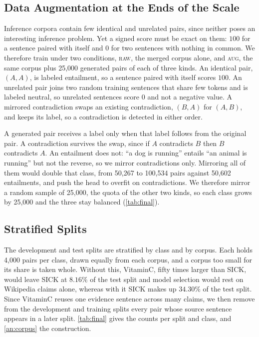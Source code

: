 \documentclass[11pt]{article}
\begin{document}
\subsection{Data Augmentation at the Ends of the Scale}

Inference corpora contain few identical and unrelated pairs, since neither poses an interesting inference problem.
Yet a signed score must be exact on them: $100$ for a sentence paired with itself and $0$ for two sentences with nothing in common.
We therefore train under two conditions, \textsc{raw}, the merged corpus alone, and \textsc{aug}, the same corpus plus 25{,}000 generated pairs of each of three kinds.
An identical pair, $(A, A)$, is labeled entailment, so a sentence paired with itself scores $100$.
An unrelated pair joins two random training sentences that share few tokens and is labeled neutral, so unrelated sentences score $0$ and not a negative value.
A mirrored contradiction swaps an existing contradiction, $(B, A)$ for $(A, B)$, and keeps its label, so a contradiction is detected in either order.

A generated pair receives a label only when that label follows from the original pair.
A contradiction survives the swap, since if $A$ contradicts $B$ then $B$ contradicts $A$.
An entailment does not: ``a dog is running'' entails ``an animal is running'' but not the reverse, so we mirror contradictions only.
Mirroring all of them would double that class, from 50{,}267 to 100{,}534 pairs against 50{,}602 entailments, and push the head to overfit on contradictions.
We therefore mirror a random sample of 25{,}000, the quota of the other two kinds, so each class grows by 25{,}000 and the three stay balanced (\autoref{tab:final}).

\subsection{Stratified Splits}

The development and test splits are stratified by class and by corpus.
Each holds 4{,}000 pairs per class, drawn equally from each corpus, and a corpus too small for its share is taken whole.
Without this, VitaminC, fifty times larger than SICK, would leave SICK at $8.16\%$ of the test split and model selection would rest on Wikipedia claims alone, whereas with it SICK makes up $34.30\%$ of the test split.
Since VitaminC reuses one evidence sentence across many claims, we then remove from the development and training splits every pair whose source sentence appears in a later split.
\autoref{tab:final} gives the counts per split and class, and \autoref{an:corpus} the construction.
\end{document}
